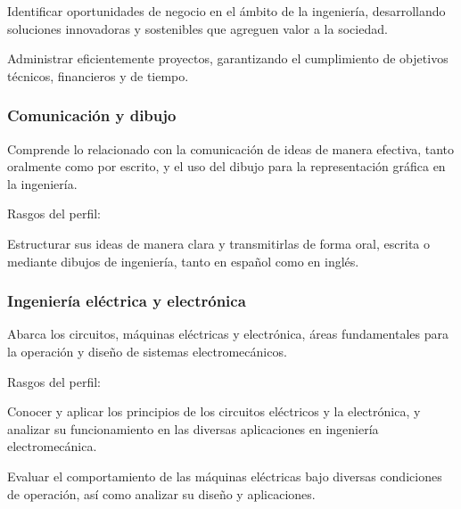 \begin{cuadroazul}[FPH02]
Identificar oportunidades de negocio en el ámbito de la ingeniería, desarrollando soluciones innovadoras y sostenibles que agreguen valor a la sociedad.
\end{cuadroazul}

\begin{cuadroazul}[FPH03]
Administrar eficientemente proyectos, garantizando el cumplimiento de objetivos técnicos, financieros y de tiempo.
\end{cuadroazul}

\subsubsection*{Comunicación y dibujo}

Comprende lo relacionado con la comunicación de ideas de manera efectiva, tanto oralmente como por escrito, y el uso del dibujo para la representación gráfica en la ingeniería.\par

Rasgos del perfil:\par

\begin{cuadroazul}[CYD01]
Estructurar sus ideas de manera clara y transmitirlas de forma oral, escrita o mediante dibujos de ingeniería, tanto en español como en inglés.
\end{cuadroazul}

\subsubsection*{Ingeniería eléctrica y electrónica}

Abarca los circuitos, máquinas eléctricas y electrónica, áreas fundamentales para la operación y diseño de sistemas electromecánicos.\par

Rasgos del perfil:\par

\begin{cuadroazul}[IEE01]
Conocer y aplicar los principios de los circuitos eléctricos y la electrónica, y analizar su funcionamiento en las diversas aplicaciones en ingeniería electromecánica.
\end{cuadroazul}

\begin{cuadroazul}[IEE02]
Evaluar el comportamiento de las máquinas eléctricas bajo diversas condiciones de operación, así como analizar su diseño y aplicaciones.
\end{cuadroazul}

